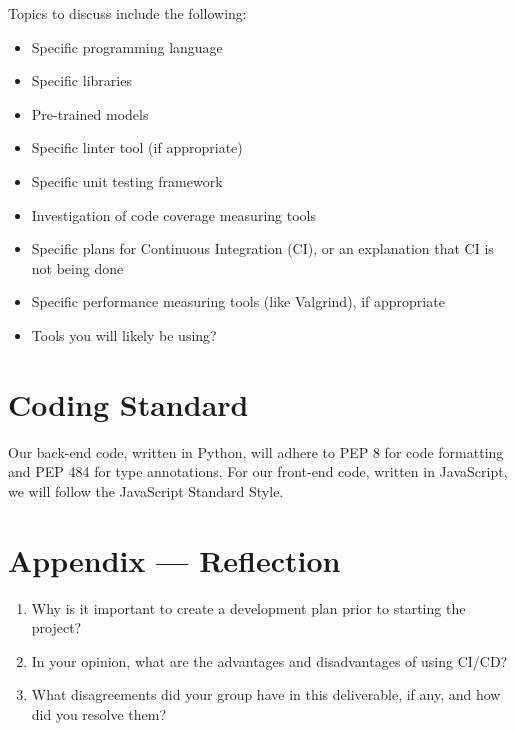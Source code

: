 \documentclass{article}
\begin{document}

Topics to discuss include the following:

\begin{itemize}
\item Specific programming language
\item Specific libraries
\item Pre-trained models
\item Specific linter tool (if appropriate)
\item Specific unit testing framework
\item Investigation of code coverage measuring tools
\item Specific plans for Continuous Integration (CI), or an explanation that CI
  is not being done
\item Specific performance measuring tools (like Valgrind), if
  appropriate
\item Tools you will likely be using?
\end{itemize}


\section{Coding Standard}
Our back-end code, written in Python, will adhere to PEP 8 for code formatting and PEP 484 for type annotations. 
For our front-end code, written in JavaScript, we will follow the JavaScript Standard Style.

\newpage{}

\section*{Appendix --- Reflection}




\begin{enumerate}
    \item Why is it important to create a development plan prior to starting the
    project?
    \item In your opinion, what are the advantages and disadvantages of using
    CI/CD?
    \item What disagreements did your group have in this deliverable, if any,
    and how did you resolve them?
\end{enumerate}
\end{document}
